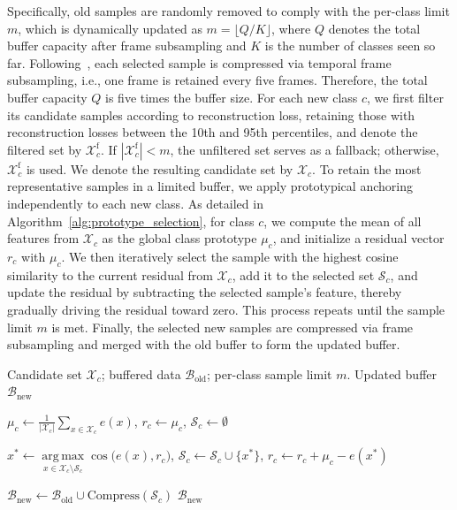 \documentclass[journal]{IEEEtran}
\DeclareMathOperator*{\argmax}{arg\,max}
\begin{document}
Specifically, old samples are randomly removed to comply with the per-class limit \(m\), which is dynamically updated as
$m=\lfloor Q/K\rfloor$, where $Q$ denotes the total buffer capacity after frame subsampling and $K$ is the number of classes seen so far. Following~\cite{mosconi2024}, each selected sample is compressed via temporal frame subsampling, i.e., one frame is retained every five frames.
Therefore, the total buffer capacity $Q$ is five times the buffer size.
For each new class $c$, we first filter its candidate samples according to reconstruction loss, retaining those with 
reconstruction losses between the 10th and 95th percentiles, and denote the filtered set by $\mathcal{X}_c^{\text{f}}$.
If $|\mathcal{X}_c^{\text{f}}| < m $, the unfiltered set serves as a fallback; otherwise, $\mathcal{X}_c^{\text{f}}$ is used. 
We denote the resulting candidate set by $\mathcal{X}_c$.
To retain the most representative samples in a limited buffer, we apply prototypical anchoring~\cite{Welling2009} independently to each new class.
As detailed in Algorithm~\ref{alg:prototype_selection}, for class $c$, we compute the mean of all features from $\mathcal{X}_c$ as the global class prototype $\mu_c$, and initialize a residual vector $r_c$ with $\mu_c$.
We then iteratively select the sample with the highest cosine similarity to the current residual from $\mathcal{X}_c$, add it to the selected set 
$\mathcal{S}_c$, and update the residual by subtracting the selected sample’s feature, thereby gradually driving the residual toward zero. 
This process repeats until the sample limit $m$ is met. 
Finally, the selected new samples are compressed via frame subsampling and merged with the old buffer to form the updated buffer.

\begin{algorithm}[t]
\footnotesize
\caption{Prototypical anchoring mechanism}
\label{alg:prototype_selection}
\begin{algorithmic}[0]
\Require Candidate set $\mathcal{X}_c$; buffered data $\mathcal{B}_{\text{old}}$; per-class sample limit $m$.
\Ensure Updated buffer $\mathcal{B}_{\text{new}}$

\State $\mu_c \gets \frac{1}{|\mathcal{X}_c|}\sum\limits_{x\in \mathcal{X}_c} e(x)$,\; 
        ${r_c}\gets\mu_c$,\; 
        $\mathcal{S}_c \gets\emptyset$


    \State $x^* \gets \argmax\limits_{x\in \mathcal{X}_c \setminus\mathcal{S}_c} \cos\!\big(e(x),{r}_c\big)$, 
    \State $\mathcal{S}_c \gets\mathcal{S}_c \cup\{x^*\}$, ${r}_c \gets {r}_c +\mu_c -e(x^*)$
    
\EndFor
\State $\mathcal{B}_{\text{new}} \gets \mathcal{B}_{\text{old}}\cup \text{Compress}(\mathcal{S}_c)$ 
\State \Return $\mathcal{B}_{\text{new}}$
\end{algorithmic}
\end{algorithm}
\end{document}
